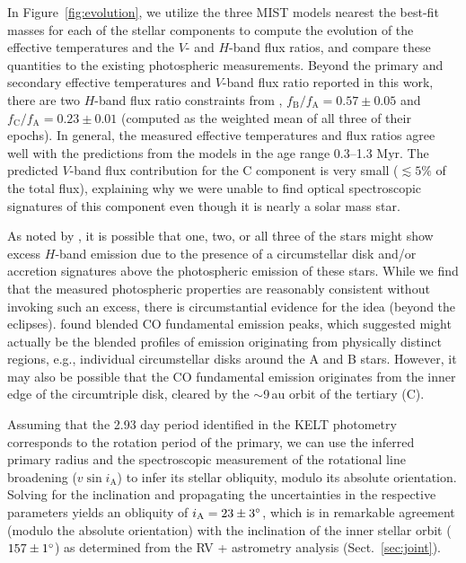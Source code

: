 \documentclass[twocolumn]{aastex61}
\begin{document}
In Figure~\ref{fig:evolution}, we utilize the three MIST models nearest the best-fit masses for each of the stellar components to compute the evolution of the effective temperatures and the $V$- and $H$-band flux ratios, and compare these quantities to the existing photospheric measurements. Beyond the primary and secondary effective temperatures and $V$-band flux ratio reported in this work, there are two $H$-band flux ratio constraints from \citet{berger11},  $f_\mathrm{B}/f_\mathrm{A} = 0.57 \pm 0.05$ and $f_\mathrm{C}/f_\mathrm{A} = 0.23 \pm 0.01$ (computed as the weighted mean of all three of their epochs). In general, the measured effective temperatures and flux ratios agree well with the predictions from the models in the age range 0.3--1.3 Myr. The predicted $V$-band flux contribution for the C component is very small ($\lesssim 5\%$ of the total flux), explaining why we were unable to find optical spectroscopic signatures of this component even though it is nearly a solar mass star.

As noted by \citet{berger11}, it is possible that one, two, or all three of the stars might show excess $H$-band emission due to the presence of a circumstellar disk and/or accretion signatures above the photospheric emission of these stars. While we find that the measured photospheric properties are reasonably consistent without invoking such an excess, there is circumstantial evidence for the idea (beyond the eclipses). \citet{najita03} found blended CO fundamental emission peaks, which \citet{bast11} suggested might actually be the blended profiles of emission originating from physically distinct regions, e.g., individual circumstellar disks around the A and B stars. However, it may also be possible that the CO fundamental emission originates from the inner edge of the circumtriple disk, cleared by the $\sim$9\,au orbit of the tertiary (C).

Assuming that the 2.93 day period identified in the KELT photometry corresponds to the rotation period of the primary, we can use the inferred primary radius and the spectroscopic measurement of the rotational line broadening ($v \sin i_\mathrm{A}$) to infer its stellar obliquity, modulo its absolute orientation. Solving for the inclination and propagating the uncertainties in the respective parameters yields an obliquity of $i_\mathrm{A} = 23 \pm 3\mbox{$^\circ$}$, which is in remarkable agreement (modulo the absolute orientation) with the inclination of the inner stellar orbit ($157 \pm 1\mbox{$^\circ$}$) as determined from the RV + astrometry analysis (Sect.~\ref{sec:joint}).
\end{document}
